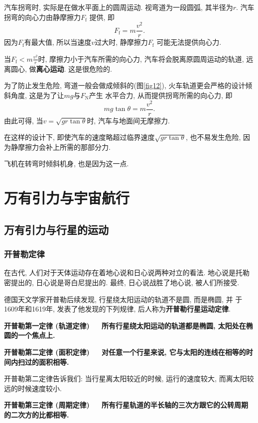 \documentclass[11pt,a4paper]{ctexbook}
\newcommand{\bre}{\ \ \ }
\begin{document}
汽车拐弯时, 实际是在做水平面上的圆周运动. 视弯道为一段圆弧, 其半径为$r$. 汽车拐弯的向心力由静摩擦力$F_\mathrm{f}$
提供, 即$$F_\mathrm{f} = m\frac{v^2}{r}.$$因为$F_\mathrm{f}$有最大值, 所以当速度$v$过大时, 静摩擦力$F_\mathrm{f}$
可能无法提供向心力.

当$F_\mathrm{f} < m\displaystyle\frac{v^2}{r}$时, 摩擦力小于汽车所需的向心力,
汽车将会脱离原圆周运动的轨道, 远离圆心, 做\textbf{离心运动}. 这是很危险的.

为了防止发生危险, 弯道一般会做成倾斜的(图\ref{fig12}), 火车轨道更会严格的设计倾斜角度, 这是为了让$mg$与$F_\mathrm{N}$产生
水平合力, 从而提供拐弯所需的向心力, 即$$mg\tan \theta = m\frac{v^2}{r}.$$
由此可得, 当$v = \sqrt{gr\tan \theta}$时, 汽车与地面间无摩擦力.

在这样的设计下, 即使汽车的速度略超过临界速度$\sqrt{gr\tan \theta}$, 也不易发生危险, 因为静摩擦力会补上所需的那部分力.

飞机在转弯时倾斜机身, 也是因为这一点.

\chapter{万有引力与宇宙航行}
\label{万有引力章}

\section{万有引力与行星的运动}

\subsection{开普勒定律}

在古代, 人们对于天体运动存在着地心说和日心说两种对立的看法. 地心说是托勒密提出的, 日心说是哥白尼提出的. 最终,
日心说战胜了地心说, 被人们所接受.

德国天文学家开普勒后续发现, 行星绕太阳运动的轨道不是圆, 而是椭圆, 并
于1609年和1619年, 发表了他发现的下列规律, 后人称为\textbf{开普勒行星运动定律}.

\textbf{开普勒第一定律 (轨道定律)\bre 所有行星绕太阳运动的轨道都是椭圆, 太阳处在椭圆的一个焦点上.}

\textbf{开普勒第二定律 (面积定律)\bre 对任意一个行星来说, 它与太阳的连线在相等的时间内扫过的面积相等.}

开普勒第二定律告诉我们: 当行星离太阳较近的时候, 运行的速度较大, 而离太阳较远的时候速度较小.

\textbf{开普勒第三定律 (周期定律)\bre 所有行星轨道的半长轴的三次方跟它的公转周期的二次方的比都相等.}
\end{document}

